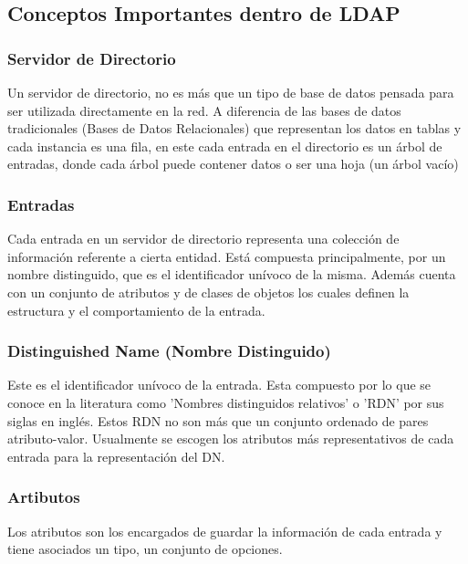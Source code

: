 \newpage

\subsection{Conceptos Importantes dentro de LDAP}

\subsubsection{Servidor de Directorio}
Un servidor de directorio, no es m\'as que un tipo de base de datos pensada para ser utilizada directamente en la red. A diferencia de las bases de datos tradicionales (Bases de Datos Relacionales) que representan los datos en tablas y cada instancia es una fila, en este cada entrada en el directorio es un \'arbol de entradas, donde cada \'arbol puede contener datos o ser una hoja (un \'arbol vac\'io)
	
\subsubsection{Entradas}
Cada entrada en un servidor de directorio representa una colecci\'on de informaci\'on referente a cierta entidad. Est\'a compuesta principalmente, por un nombre distinguido, que es el identificador un\'ivoco de la misma. Adem\'as cuenta con un conjunto de atributos y de clases de objetos los cuales definen la estructura y el comportamiento de la entrada.

\subsubsection{Distinguished Name (Nombre Distinguido)} 
Este es el identificador un\'ivoco de la entrada. Esta compuesto por lo que se conoce en la literatura como 'Nombres distinguidos relativos' o 'RDN' por sus siglas en ingl\'es. Estos RDN no son m\'as que un conjunto ordenado de pares atributo-valor. Usualmente se escogen los atributos m\'as representativos de cada entrada para la representaci\'on del DN.

\subsubsection{Artibutos}
Los atributos son los encargados de guardar la informaci\'on de cada entrada y tiene asociados un tipo, un conjunto de opciones.

